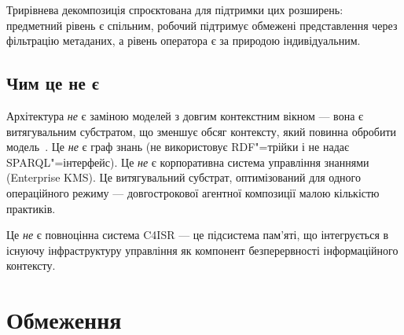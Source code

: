 \documentclass[11pt]{article}
\begin{document}
Трирівнева декомпозиція спроєктована для підтримки цих розширень: предметний рівень є спільним, робочий підтримує обмежені представлення через фільтрацію метаданих, а рівень оператора є за природою індивідуальним.

\subsection{Чим це не є}
\label{sec:disc-not}

Архітектура \emph{не} є заміною моделей з довгим контекстним вікном --- вона є витягувальним субстратом, що зменшує обсяг контексту, який повинна обробити модель~\citep{reid2024gemini, liu2023lost}.
Це \emph{не} є граф знань (не використовує RDF"=трійки і не надає SPARQL"=інтерфейс).
Це \emph{не} є корпоративна система управління знаннями (Enterprise KMS).
Це витягувальний субстрат, оптимізований для одного операційного режиму --- довгострокової агентної композиції малою кількістю практиків.

Це \emph{не} є повноцінна система C4ISR --- це підсистема пам'яті, що інтегрується в існуючу інфраструктуру управління як компонент безперервності інформаційного контексту.


\section{Обмеження}
\label{sec:limitations}
\end{document}
